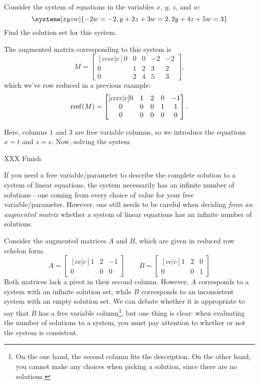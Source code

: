 	\begin{example}
		Consider the system of equations in the variables $x$, $y$, $z$, and $w$:
		\[
			\systeme[xyzw]{-2w=-2,y+2z+3w=2,2y+4z+5w=3}
		\]
		Find the solution set for this system.

		The augmented matrix corresponding to this system is
		\[
			M=\begin{bmatrix}[cccc|c]0&0&0&-2&-2\\0&1&2&3&2\\0&2&4&5&3\end{bmatrix},
		\]
		which we've row reduced in a previous example:
		\[
			\operatorname{rref}(M) = 
			\begin{bmatrix}[cccc|c]
				0&1&2&0&-1\\
				0&0&0&1&1\\0&0&0&0&0
			\end{bmatrix}.
		\]

		Here, columns $1$ and $3$ are free variable columns, so we introduce the equations $x=t$ and $z=s$.
		Now, solving the system


		XXX Finish
	\end{example}


	If you need a free variable/parameter to describe the complete solution to a system of linear equations,
	the system necessarily has an infinite number of solutions---one coming from every choice of value for your
	free variable/parameter. However, one still needs to be careful when deciding \emph{from an augmented matrix}
	whether a system of linear equations has an infinite number of solutions.

	Consider the augmented matrices $A$ and $B$, which are given in reduced row echelon form.
	\[
		A=\begin{bmatrix}[cc|c]
			1&2&-1\\0&0&0
		\end{bmatrix}
		\qquad
		B=\begin{bmatrix}[cc|c]
			1&2&0\\0&0&1
		\end{bmatrix}
	\]
	Both matrices lack a pivot in their second column. However, $A$ corresponds to a system with an infinite solution
	set, while $B$ corresponds to an inconsistent system with an empty solution set. We can debate whether it is appropriate
	to say that $B$ has a free variable column\footnote{ On the one hand, the second column fits the description. On the other hand,
	you cannot make any choices when picking a solution, since there are no solutions.}, but one thing is clear:
	when evaluating the number of solutions to a system, you must pay attention to whether or not the system is consistent.


